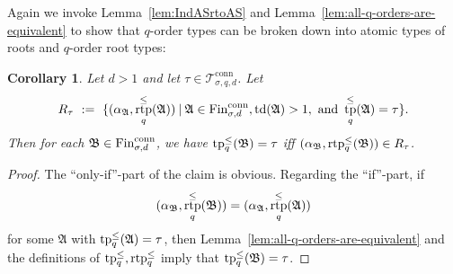 \documentclass[11pt]{article}
\newtheorem{corollary}[theorem]{Corollary}
\newcommand{\fin}{\textup{Fin}}
\newcommand{\conn}{\text{conn}}
\newcommand{\logic}[1]{\textsc{#1}}
\newcommand{\ctypes}[1][\sigma,q,d]{\mathcal{T}^{\conn}_{#1}}
\newcommand{\st}{\mathbin |}
\newcommand{\leqsym}{\logic{\ensuremath{\leq}}}
\DeclareMathOperator{\tp}{tp}
\DeclareMathOperator{\rtp}{rtp}
\newcommand{\struct}[1]{\mathfrak{#1}}
\newcommand{\AS}{\struct{A}}
\newcommand{\BS}{\struct{B}}
\newcommand{\td}{\operatorname{td}}
\begin{document}
Again we invoke Lemma~\ref{lem:IndASrtoAS} and
Lemma~\ref{lem:all-q-orders-are-equivalent} to show that $q$-order types can be
broken down into atomic types of roots and $q$-order root types:

\begin{corollary}
  \label{cor:rtp-to-tp}
  Let $d > 1$ and let $\tau\in\ctypes[\sigma, q,d]$.  Let
  \[
  R_{\tau}\ :=\ \{(\alpha_\AS, \rtp_q^\leqsym(\AS)) \st
  \AS \in \fin^{\conn}_{\sigma,d}, \td(\AS) > 1,\text{ and
  }\tp_q^\leqsym(\AS)=\tau \}.
  \]
  Then for each $\BS\in \fin^{\conn}_{\sigma,d}$, we have
  $\tp_q^\leqsym(\BS)=\tau$
  iff
  $(\alpha_\BS, \rtp_q^\leqsym(\BS)) \in  R_{\tau}$.
\end{corollary}
\begin{proof}
  The ``only-if''-part of the claim is obvious.  Regarding the
  ``if''-part, if 
  \[
  (\alpha_\BS, \rtp_q^\leqsym(\BS))= 
  (\alpha_\AS, \rtp_q^\leqsym(\AS))
  \]
  for some $\AS$ with $\tp^\leqsym_q(\AS)=\tau$,
  then Lemma~\ref{lem:all-q-orders-are-equivalent} and the definitions
  of $\tp^\leqsym_q,\rtp^\leqsym_q$ imply that
  $\tp_q^\leqsym(\BS)=\tau$.
\end{proof}
\end{document}
